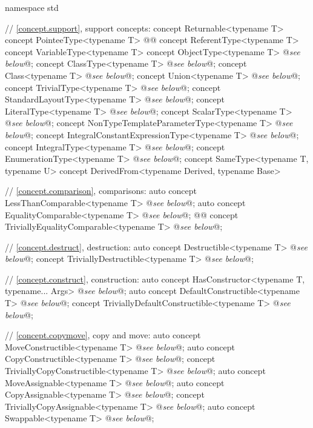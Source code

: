 \documentclass[american,twoside]{book}
\begin{document}
\begin{codeblock}
namespace std {
  // \ref{concept.support}, support concepts:
  concept Returnable<typename T> { }
  concept PointeeType<typename T> { }
  @@
  concept ReferentType<typename T> { }
  concept VariableType<typename T> { }
  concept ObjectType<typename T> @\textit{see below}@;
  concept ClassType<typename T> @\textit{see below}@;
  concept Class<typename T> @\textit{see below}@;
  concept Union<typename T> @\textit{see below}@;
  concept TrivialType<typename T> @\textit{see below}@;
  concept StandardLayoutType<typename T> @\textit{see below}@;
  concept LiteralType<typename T> @\textit{see below}@;
  concept ScalarType<typename T> @\textit{see below}@;
  concept NonTypeTemplateParameterType<typename T> @\textit{see below}@;
  concept IntegralConstantExpressionType<typename T> @\textit{see below}@;
  concept IntegralType<typename T> @\textit{see below}@;
  concept EnumerationType<typename T> @\textit{see below}@;
  concept SameType<typename T, typename U> {  }
  concept DerivedFrom<typename Derived, typename Base> { }

  // \ref{concept.comparison}, comparisons:
  auto concept LessThanComparable<typename T> @\textit{see below}@;
  auto concept EqualityComparable<typename T> @\textit{see below}@;
  @@ concept TriviallyEqualityComparable<typename T> @\textit{see below}@;

  // \ref{concept.destruct}, destruction:
  auto concept Destructible<typename T> @\textit{see below}@;
  concept TriviallyDestructible<typename T> @\textit{see below}@;

  // \ref{concept.construct}, construction:
  auto concept HasConstructor<typename T, typename... Args> @\textit{see below}@;
  auto concept DefaultConstructible<typename T> @\textit{see below}@;
  concept TriviallyDefaultConstructible<typename T> @\textit{see below}@;

  // \ref{concept.copymove}, copy and move:
  auto concept MoveConstructible<typename T> @\textit{see below}@;
  auto concept CopyConstructible<typename T> @\textit{see below}@;
  concept TriviallyCopyConstructible<typename T> @\textit{see below}@;
  auto concept MoveAssignable<typename T> @\textit{see below}@;
  auto concept CopyAssignable<typename T> @\textit{see below}@;
  concept TriviallyCopyAssignable<typename T> @\textit{see below}@;
  auto concept Swappable<typename T> @\textit{see below}@;

}
\end{codeblock}
\end{document}
